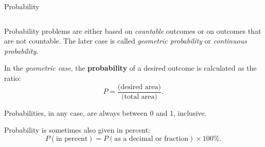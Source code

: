 \documentclass[9pt,aspectratio=169]{beamer}
\begin{document}
\begin{frame}{Probability}
\begin{columns}[T]
\begin{column}{0.5\textwidth}
      Probability problems are either based on \emph{countable} outcomes or on outcomes that are not countable. The later case is called \emph{geometric probability} or \emph{continuous probability}.

      \begin{definition}
        In the \emph{geometric case}, the \textbf{probability} of a desired outcome is calculated as the ratio:
        \[ P = \frac{\text{(desired area)}}{\text{(total area)}}. \]
        \vspace*{-1.5ex}
      \end{definition}

      Probabilities, in any case, are always between $0$ and $1$, inclusive.

      Probability is sometimes also given in percent:
      \[ 𝑃(\text{in percent}) = 𝑃(\text{as a decimal or fraction}) \times 100\%. \]

    \end{column}
  \end{columns}
\end{frame}
\end{document}
